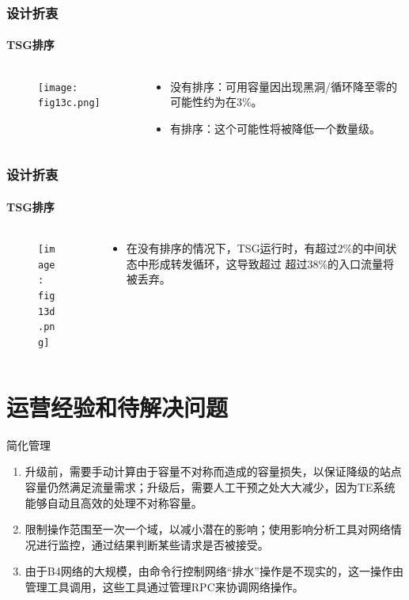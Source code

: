\begin{frame}
    \frametitle{设计折衷}
    \framesubtitle{TSG排序}
    \begin{columns}
        \begin{column}{0.4\textwidth}
            \begin{figure}
                \texttt{[image: fig13c.png]}
            \end{figure}
        \end{column}
        \begin{column}{0.6\textwidth}
            \begin{itemize}
                \item 没有排序：可用容量因出现黑洞/循环降至零的可能性约为在3\%。
                \item 有排序：这个可能性将被降低一个数量级。
            \end{itemize}
        \end{column}
    \end{columns}
\end{frame}

\begin{frame}
    \frametitle{设计折衷}
    \framesubtitle{TSG排序}
    \begin{columns}
        \begin{column}{0.4\textwidth}
            \begin{figure}
                \texttt{[image: fig13d.png]}
            \end{figure}
        \end{column}
        \begin{column}{0.6\textwidth}
            \begin{itemize}
                \item 在没有排序的情况下，TSG运行时，有超过2\%的中间状态中形成转发循环，这导致超过 超过38\%的入口流量将被丢弃。
            \end{itemize}
        \end{column}
    \end{columns}
\end{frame}

\section{运营经验和待解决问题}
\begin{frame}{简化管理}
    \begin{enumerate}
        \item 升级前，需要手动计算由于容量不对称而造成的容量损失，以保证降级的站点容量仍然满足流量需求；升级后，需要人工干预之处大大减少，因为TE系统能够自动且高效的处理不对称容量。
        \item 限制操作范围至一次一个域，以减小潜在的影响；使用影响分析工具对网络情况进行监控，通过结果判断某些请求是否被接受。
        \item 由于B4网络的大规模，由命令行控制网络“排水”操作是不现实的，这一操作由管理工具调用，这些工具通过管理RPC来协调网络操作。
    \end{enumerate}

\end{frame}

